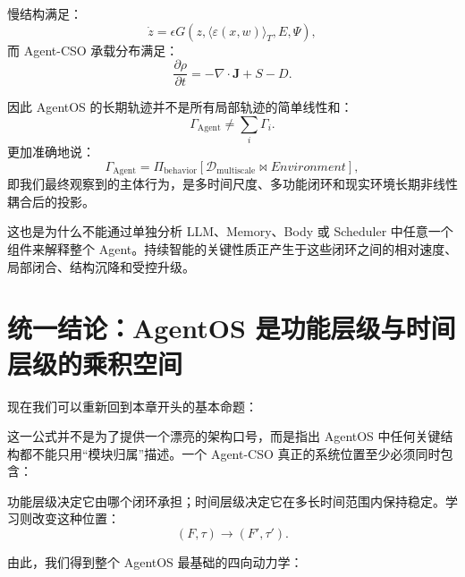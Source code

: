 慢结构满足：
\[
\dot z
=
\epsilon
G
\left(
z,
\langle \varepsilon(x,w)\rangle_T,
E,
\Psi
\right),
\]
而 Agent-CSO 承载分布满足：
\[
\frac{\partial\rho}{\partial t}
=
-\nabla\cdot\mathbf J
+
S-D.
\]

因此 AgentOS 的长期轨迹并不是所有局部轨迹的简单线性和：
\[
\Gamma_{\mathrm{Agent}}
\neq
\sum_i\Gamma_i.
\]
更加准确地说：
\[
\boxed{
\Gamma_{\mathrm{Agent}}
=
\Pi_{\mathrm{behavior}}
\left[
\mathcal D_{\mathrm{multiscale}}
\bowtie
Environment
\right],
}
\]
即我们最终观察到的主体行为，是多时间尺度、多功能闭环和现实环境长期非线性耦合后的投影。

这也是为什么不能通过单独分析 LLM、Memory、Body 或 Scheduler 中任意一个组件来解释整个 Agent。持续智能的关键性质正产生于这些闭环之间的相对速度、局部闭合、结构沉降和受控升级。


\section{统一结论：AgentOS 是功能层级与时间层级的乘积空间}

现在我们可以重新回到本章开头的基本命题：
\begin{statementbox}
\centering
{}
\end{statementbox}
这一公式并不是为了提供一个漂亮的架构口号，而是指出 AgentOS 中任何关键结构都不能只用“模块归属”描述。一个 Agent-CSO 真正的系统位置至少必须同时包含：
\begin{statementbox}
\centering
{}
\end{statementbox}

功能层级决定它由哪个闭环承担；时间层级决定它在多长时间范围内保持稳定。学习则改变这种位置：
\[
(F,\tau)
\rightarrow
(F',\tau').
\]

由此，我们得到整个 AgentOS 最基础的四向动力学：

\begin{statementbox}
\centering
{}
\end{statementbox}

